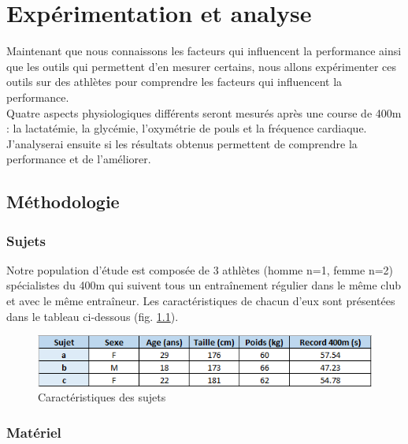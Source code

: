 
\chapter{Expérimentation et analyse}
\label{part:experimentation}

Maintenant que nous connaissons les facteurs qui influencent la performance ainsi que les outils qui permettent d'en mesurer certains, nous allons expérimenter ces outils sur des athlètes pour comprendre les facteurs qui influencent la performance.\\

Quatre aspects physiologiques différents seront mesurés après une course de 400m : la lactatémie, la glycémie, l'oxymétrie de pouls et la fréquence cardiaque. J'analyserai ensuite si les résultats obtenus permettent de comprendre la performance et de l'améliorer.\\
    
    
    \section{Méthodologie}
    \label{chap:methodo}

        \subsection{Sujets}
    
            Notre population d'étude est composée de 3 athlètes (homme n=1, femme n=2) spécialistes du 400m qui suivent tous un entraînement régulier dans le même club et avec le même entraîneur. Les caractéristiques de chacun d'eux sont présentées dans le tableau ci-dessous (fig. \ref{fig:tab-caracteristiques}).\\
            
              \begin{figure}[H]
                    \centering
                    \includegraphics[scale=1]{images/tab_caracteristiques}
                    \caption{\label{fig:tab-caracteristiques}Caractéristiques des sujets}
                \end{figure}
            
            
            \subsection{Matériel}
            
